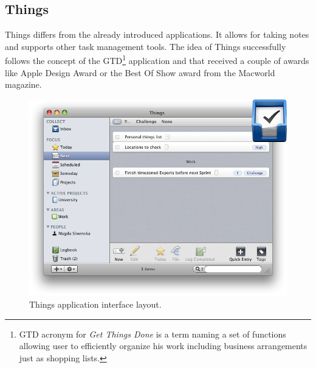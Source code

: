 \subsection{Things}\label{subsec:things} 
Things differs from the already introduced applications. It allows for taking notes and supports other task management tools. The idea of Things successfully follows the concept of the GTD\footnote{GTD acronym for \textit{Get Things Done} is a term naming a set of functions allowing user to efficiently organize his work including business arrangements just as shopping lists.} application and that received a couple of awards like Apple Design Award or the Best Of Show award from the Macworld magazine. 
\begin{figure}[ht]
\begin{center}
\includegraphics[scale=0.38]{img/things_demo.png}
\caption{Things application interface layout.}
\label{fig:things_demo}
\end{center}
\end{figure}
 
